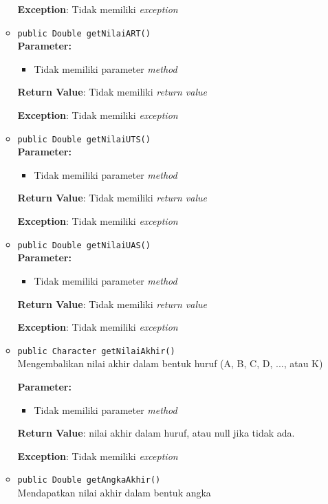 \documentclass{article}
\begin{document}
\begin{enumerate}
\begin{itemize}
\textbf{Exception}: Tidak memiliki \textit{exception}

\item \texttt{public Double getNilaiART()}\\ 


\textbf{Parameter:}\begin{itemize}
\item Tidak memiliki parameter \textit{method}
\end{itemize}
\textbf{Return Value}: Tidak memiliki \textit{return value}

\textbf{Exception}: Tidak memiliki \textit{exception}

\item \texttt{public Double getNilaiUTS()}\\ 


\textbf{Parameter:}\begin{itemize}
\item Tidak memiliki parameter \textit{method}
\end{itemize}
\textbf{Return Value}: Tidak memiliki \textit{return value}

\textbf{Exception}: Tidak memiliki \textit{exception}

\item \texttt{public Double getNilaiUAS()}\\ 


\textbf{Parameter:}\begin{itemize}
\item Tidak memiliki parameter \textit{method}
\end{itemize}
\textbf{Return Value}: Tidak memiliki \textit{return value}

\textbf{Exception}: Tidak memiliki \textit{exception}

\item \texttt{public Character getNilaiAkhir()}\\ 
Mengembalikan nilai akhir dalam bentuk huruf (A, B, C, D, ..., atau K)

\textbf{Parameter:}\begin{itemize}
\item Tidak memiliki parameter \textit{method}
\end{itemize}
\textbf{Return Value}: nilai akhir dalam huruf, atau null jika tidak ada.

\textbf{Exception}: Tidak memiliki \textit{exception}

\item \texttt{public Double getAngkaAkhir()}\\ 
Mendapatkan nilai akhir dalam bentuk angka


\end{itemize}
\end{enumerate}
\end{document}

